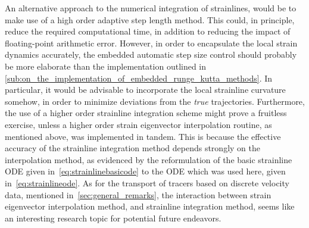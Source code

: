 An alternative approach to the numerical integration of strainlines, would be
to make use of a high order adaptive step length method. This could, in
principle, reduce the required computational time, in addition to reducing
the impact of floating-point arithmetic error. However, in order to encapsulate
the local strain dynamics accurately, the embedded automatic step size control
should probably be more elaborate than the implementation outlined in
\cref{sub:on_the_implementation_of_embedded_runge_kutta_methods}. In particular,
it would be advisable to incorporate the local strainline curvature somehow,
in order to minimize deviations from the \emph{true} trajectories. Furthermore,
the use of a higher order strainline integration scheme might prove a fruitless
exercise, unless a higher order strain eigenvector interpolation routine, as
mentioned above, was implemented in tandem. This is because the effective
accuracy of the strainline integration method depends strongly on the
interpolation method, as evidenced by the reformulation of the basic
strainline ODE given in~\cref{eq:strainlinebasicode} to the ODE which
was used here, given in~\cref{eq:strainlineode}. As for the transport of tracers
based on discrete velocity data, mentioned in~\cref{sec:general_remarks}, the
interaction between strain eigenvector interpolation method, and strainline
integration method, seems like an interesting research topic for potential
future endeavors.

%
